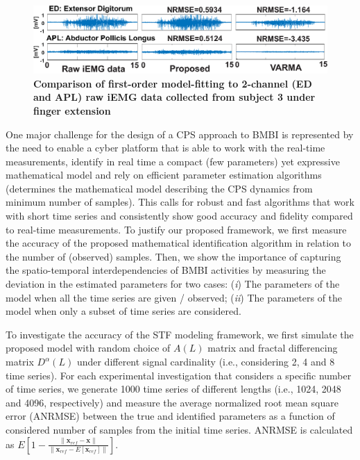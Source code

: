 \begin{figure}%
\centering
\includegraphics[width=1.0\columnwidth]{comparison_2.eps}
\caption{\textbf{Comparison of first-order model-fitting to 2-channel  (ED and APL) raw iEMG data collected from subject 3 under finger extension} }\label{fig:comparison}
\end{figure}
One major challenge for the design of a CPS approach to BMBI is represented by the need to enable a cyber platform that is able to work with the real-time measurements, identify in real time a compact (few parameters) yet expressive mathematical model and rely on efficient parameter estimation algorithms (determines the mathematical model describing the CPS dynamics from minimum number of samples). This calls for robust and fast algorithms that work with short time series and consistently show good accuracy and fidelity compared to real-time measurements. To justify our proposed framework, we first measure the accuracy of the proposed mathematical identification algorithm in relation to the number of (observed) samples. Then, we show the importance of capturing the spatio-temporal interdependencies of BMBI activities by measuring the deviation in the estimated parameters for two cases: (\textit{i}) The parameters of the model when all the time series are given / observed; (\textit{ii}) The parameters of the model when only a subset of time series are considered.

To investigate the accuracy of the STF modeling framework, we first simulate the proposed model with random choice of $A(L)$ matrix and fractal differencing matrix $D^{\alpha}(L)$ under different signal cardinality (i.e., considering 2, 4 and 8 time series). For each experimental investigation that considers a specific number of time series, we generate 1000 time series of different lengths (i.e., 1024, 2048 and 4096, respectively) and measure the average normalized root mean square error (ANRMSE) between the true and identified parameters as a function of considered number of samples from the initial time series. ANRMSE is calculated as $E[1-\frac{\| \textbf{x}_{ref}-\textbf{x} \|}{\|\textbf{x}_{ref}-E[\textbf{x}_{ref}]\|}]$.

